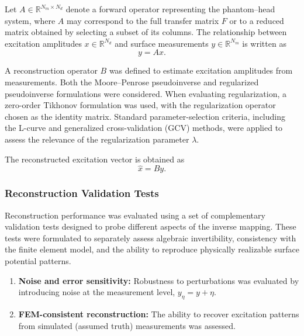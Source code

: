 Let $A \in \mathbb{R}^{N_m \times N_d}$ denote a forward operator representing the phantom--head system, where $A$ may correspond to the full transfer matrix $F$ or to a reduced matrix obtained by selecting a subset of its columns. The relationship between excitation amplitudes $x \in \mathbb{R}^{N_d}$ and surface measurements $y \in \mathbb{R}^{N_m}$ is written as
\[
y = A x.
\]

A reconstruction operator $B$ was defined to estimate excitation amplitudes from measurements. Both the Moore--Penrose pseudoinverse and regularized pseudoinverse formulations were considered. When evaluating regularization, a zero-order Tikhonov formulation was used, with the regularization operator chosen as the identity matrix. Standard parameter-selection criteria, including the L-curve and generalized cross-validation (GCV) methods, were applied to assess the relevance of the regularization parameter $\lambda$.

The reconstructed excitation vector is obtained as
\[
\hat{x} = B y.
\]


\subsubsection{Reconstruction Validation Tests}

Reconstruction performance was evaluated using a set of complementary validation tests designed to probe different aspects of the inverse mapping. These tests were formulated to separately assess algebraic invertibility, consistency with the finite element model, and the ability to reproduce physically realizable surface potential patterns.

\begin{enumerate}
    \item \textbf{Noise and error sensitivity:} Robustness to perturbations was evaluated by introducing noise at the measurement level, $y_{\eta} = y + \eta$.
    \item \textbf{FEM-consistent reconstruction:} The ability to recover excitation patterns from simulated (assumed truth) measurements was assessed.
\end{enumerate}
